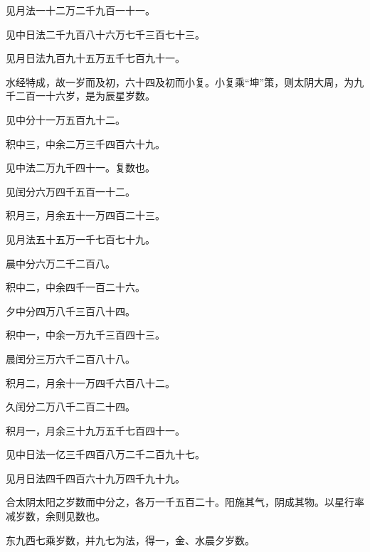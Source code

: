 \documentclass[12pt,UTF8]{ctexbook}
\begin{document}
见月法一十二万二千九百一十一。



见中日法二千九百八十六万七千三百七十三。



见月日法九百九十五万五千七百九十一。



水经特成，故一岁而及初，六十四及初而小复。小复乘“坤”策，则太阴大周，为九千二百一十六岁，是为辰星岁数。



见中分十一万五百九十二。



积中三，中余二万三千四百六十九。



见中法二万九千四十一。复数也。



见闰分六万四千五百一十二。



积月三，月余五十一万四百二十三。



见月法五十五万一千七百七十九。



晨中分六万二千二百八。



积中二，中余四千一百二十六。



夕中分四万八千三百八十四。



积中一，中余一万九千三百四十三。



晨闰分三万六千二百八十八。



积月二，月余十一万四千六百八十二。



久闰分二万八千二百二十四。



积月一，月余三十九万五千七百四十一。



见中日法一亿三千四百八万二千二百九十七。



见月日法四千四百六十九万四千九十九。



合太阴太阳之岁数而中分之，各万一千五百二十。阳施其气，阴成其物。以星行率减岁数，余则见数也。



东九西七乘岁数，并九七为法，得一，金、水晨夕岁数。
\end{document}
